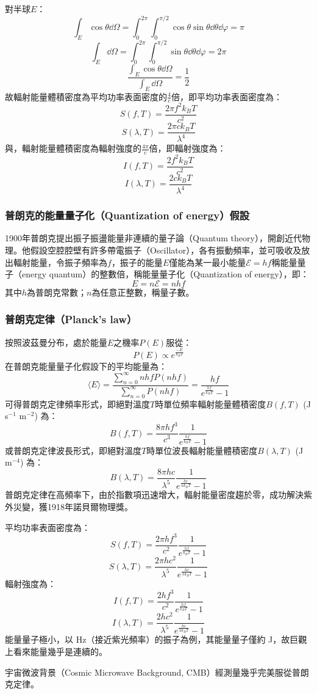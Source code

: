 \documentclass[a4paper,12pt]{article}
\begin{document}
對半球$E$：
\[\int_E\cos\theta\dd{\Omega}=\int_0^{2\pi}\int_0^{\pi/2}\cos\theta\sin\theta\dd{\theta}\dd{\varphi}=\pi\]
\[\int_E\dd{\Omega}=\int_0^{2\pi}\int_0^{\pi/2}\sin\theta\dd{\theta}\dd{\varphi}=2\pi\]
\[\frac{\int_E\cos\theta\dd{\Omega}}{\int_E\dd{\Omega}}=\frac{1}{2}\]
故輻射能量體積密度為平均功率表面密度的$\frac{4}{c}$倍，即平均功率表面密度為：
\[S(f,T)=\frac{2\pi f^2k_BT}{c^2}\]
\[S(\lambda,T)=\frac{2\pi ck_BT}{\lambda^4}\]
與，輻射能量體積密度為輻射強度的$\frac{4\pi}{c}$倍，即輻射強度為：
\[I(f,T)=\frac{2f^2k_BT}{c^2}\]
\[I(\lambda,T)=\frac{2ck_BT}{\lambda^4}\]
\subsubsection{普朗克的能量量子化（Quantization of energy）假設}
1900年普朗克提出振子振盪能量非連續的量子論（Quantum theory），開創近代物理。他假設空腔腔壁有許多帶電振子（Oscillator），各有振動頻率，並可吸收及放出輻射能量，令振子頻率為$f$，振子的能量$E$僅能為某一最小能量$\mathcal{E}=hf$稱能量量子（energy quantum）的整數倍，稱能量量子化（Quantization of energy），即：
\[E=n\mathcal{E}=nhf\]
其中$h$為普朗克常數；$n$為任意正整數，稱量子數。
\subsubsection{普朗克定律（Planck's law）}
按照波茲曼分布，處於能量$E$之機率$P(E)$服從：
\[P(E)\propto e^{\frac{-E}{k_BT}}\]
在普朗克能量量子化假設下的平均能量為：
\[\langle E\rangle=\frac{\sum_{n=0}^{\infty}nhfP(nhf)}{\sum_{n=0}^{\infty}P(nhf)}=\frac{hf}{e^{\frac{hf}{k_BT}}-1}\]
可得普朗克定律頻率形式，即絕對溫度$T$時單位頻率輻射能量體積密度$B(f,T)$ (J s$^{-1}$ m$^{-2}$) 為：
\[B(f,T)=\frac{8\pi hf^3}{c^3}\frac{1}{e^{\frac{hf}{k_BT}}-1}\]
或普朗克定律波長形式，即絕對溫度$T$時單位波長輻射能量體積密度$B(\lambda,T)$ (J m$^{-4}$) 為：
\[B(\lambda,T)=\frac{8\pi hc}{\lambda^5}\frac{1}{e^{\frac{hc}{\lambda k_BT}}-1}\]
普朗克定律在高頻率下，由於指數項迅速增大，輻射能量密度趨於零，成功解決紫外災變，獲1918年諾貝爾物理獎。

平均功率表面密度為：
\[S(f,T)=\frac{2\pi hf^3}{c^2}\frac{1}{e^{\frac{hf}{k_BT}}-1}\]
\[S(\lambda,T)=\frac{2\pi hc^2}{\lambda^5}\frac{1}{e^{\frac{hc}{\lambda k_BT}}-1}\]
輻射強度為：
\[I(f,T)=\frac{2hf^3}{c^2}\frac{1}{e^{\frac{hf}{k_BT}}-1}\]
\[I(\lambda,T)=\frac{2hc^2}{\lambda^5}\frac{1}{e^{\frac{hc}{\lambda k_BT}}-1}\]
能量量子極小，以 Hz（接近紫光頻率）的振子為例，其能量量子僅約 J，故巨觀上看來能量幾乎是連續的。

宇宙微波背景（Cosmic Microwave Background, CMB）經測量幾乎完美服從普朗克定律。
\end{document}
